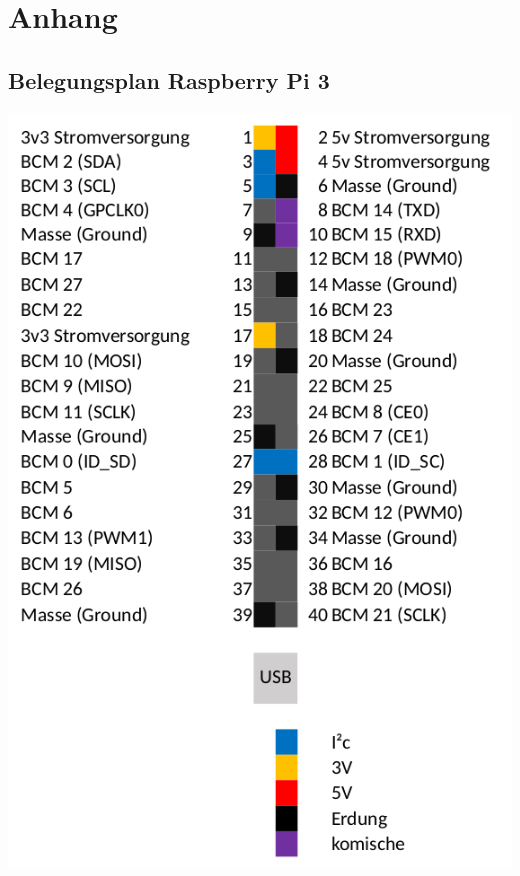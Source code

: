 \chapter{Anhang}
\section{Belegungsplan Raspberry Pi 3}
\label{Belegungsplan}
\begin{center}
	\includegraphics[width=\textwidth,angle=0]{content/pictures/raspberrypins.png}
\end{center}